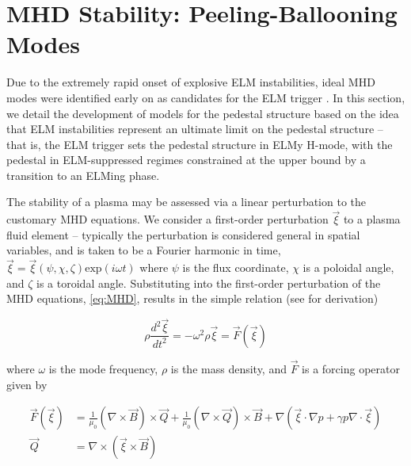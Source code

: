 \section{MHD Stability: Peeling-Ballooning Modes}\label{sec:mod_pb}

Due to the extremely rapid onset of explosive ELM instabilities, ideal MHD modes were identified early on as candidates for the ELM trigger \cite{Wagner1982,Keilhacker1984,Huysmans2005}.  In this section, we detail the development of models for the pedestal structure based on the idea that ELM instabilities represent an ultimate limit on the pedestal structure -- that is, the ELM trigger sets the pedestal structure in ELMy H-mode, with the pedestal in ELM-suppressed regimes constrained at the upper bound by a transition to an ELMing phase.

The stability of a plasma may be assessed via a linear perturbation to the customary MHD equations.  We consider a first-order perturbation $\vec{\xi}$ to a plasma fluid element -- typically the perturbation is considered general in spatial variables, and is taken to be a Fourier harmonic in time, $\vec{\xi} = \vec{\xi}(\psi,\chi,\zeta) \mbox{exp}(i\omega t)$ where $\psi$ is the flux coordinate, $\chi$ is a poloidal angle, and $\zeta$ is a toroidal angle.  Substituting into the first-order perturbation of the MHD equations, \cref{eq:MHD}, results in the simple relation (see \cite[\S 8]{Freidberg1987} for derivation)

\begin{equation}\label{eq:mhd_perturb}
 \rho \frac{d^2 \vec{\xi}}{dt^2} = -\omega^2 \rho \vec{\xi} = \vec{F}\left( \vec{\xi} \right)
\end{equation}

\noindent where $\omega$ is the mode frequency, $\rho$ is the mass density, and $\vec{F}$ is a forcing operator given by

\begin{equation}\label{eq:forcing}
 \begin{aligned}
  \vec{F}\left( \vec{\xi} \right) &= \frac{1}{\mu_0} \left( \nabla \times \vec{B} \right) \times \vec{Q} + \frac{1}{\mu_0} \left( \nabla \times \vec{Q} \right) \times \vec{B} + \nabla \left( \vec{\xi} \cdot \nabla p + \gamma p \nabla \cdot \vec{\xi} \right)\\
  \vec{Q} &= \nabla \times \left( \vec{\xi} \times \vec{B} \right)
 \end{aligned}
\end{equation}

